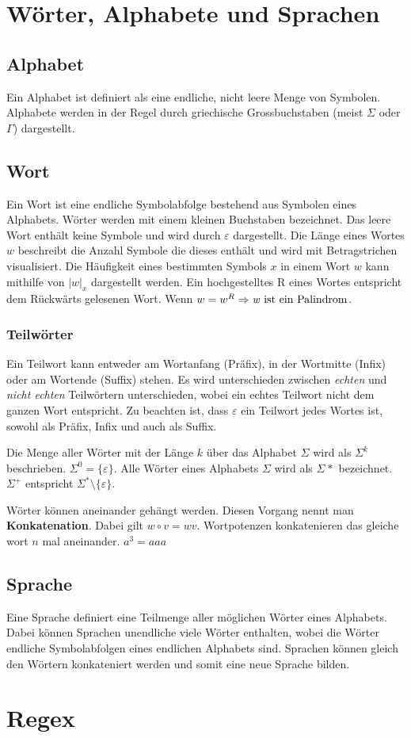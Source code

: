 \documentclass{article}
\author{Philipp Kiss}
\begin{document}
\section{Wörter, Alphabete und Sprachen}
\subsection{Alphabet} 
Ein Alphabet ist definiert als eine endliche, nicht leere Menge von Symbolen. Alphabete werden in der Regel durch griechische Grossbuchstaben (meist $\Sigma$ oder $\Gamma$) dargestellt.
\subsection{Wort} 
Ein Wort ist eine endliche Symbolabfolge bestehend aus Symbolen eines Alphabets. Wörter werden mit einem kleinen Buchstaben bezeichnet. Das leere Wort enthält keine Symbole und wird durch $\varepsilon$ dargestellt. Die Länge eines Wortes  $w$ beschreibt die Anzahl Symbole die dieses enthält und wird mit Betragstrichen visualisiert. Die Häufigkeit eines bestimmten Symbols $x$ in einem Wort $w$ kann mithilfe von $|w|_x$ dargestellt werden. Ein hochgestelltes R eines Wortes entspricht dem Rückwärts gelesenen Wort. Wenn $w = w^{R} \Rightarrow \textrm{\textit{w}  ist ein Palindrom}$.
\subsubsection{Teilwörter}
Ein Teilwort kann entweder am Wortanfang (Präfix), in der Wortmitte (Infix) oder am Wortende (Suffix) stehen. Es wird unterschieden zwischen \textit{echten} und \textit{nicht echten} Teilwörtern unterschieden, wobei ein echtes Teilwort nicht dem ganzen Wort entspricht.
Zu beachten ist, dass $\varepsilon$ ein Teilwort jedes Wortes ist, sowohl als Präfix, Infix und auch als Suffix.

Die Menge aller Wörter mit der Länge $k$ über das Alphabet $\Sigma$ wird als $\Sigma^{k}$ beschrieben. $\Sigma^{0} = \{\varepsilon\}$. Alle Wörter eines Alphabets $\Sigma$ wird als $\Sigma^{}*$ bezeichnet. $\Sigma^{+}$ entspricht $\Sigma^{*} \setminus \{\varepsilon\}$.

Wörter können aneinander gehängt werden. Diesen Vorgang nennt man \textbf{Konkatenation}. Dabei gilt $w \circ v = wv$. Wortpotenzen konkatenieren das gleiche wort $n$ mal aneinander. $a^{3} = aaa$
\subsection{Sprache}
Eine Sprache definiert eine Teilmenge aller möglichen Wörter eines Alphabets. Dabei können Sprachen unendliche viele Wörter enthalten, wobei die Wörter endliche Symbolabfolgen eines endlichen Alphabets sind. Sprachen können gleich den Wörtern konkateniert werden und somit eine neue Sprache bilden.

\section{Regex}
\end{document}
